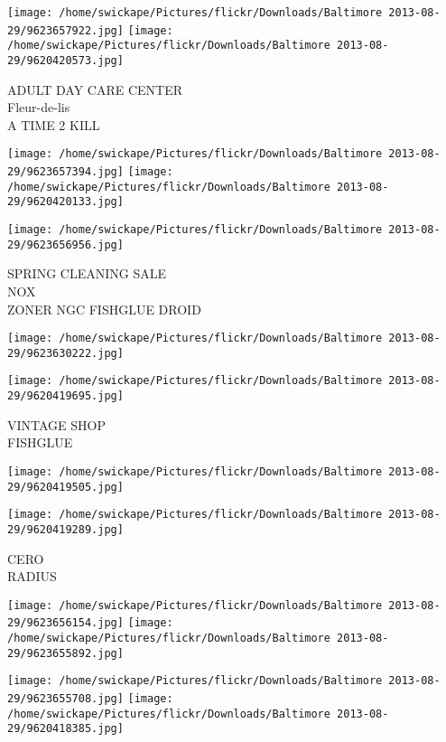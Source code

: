 \documentclass[10pt,letterpaper]{article}
\begin{document}
\vspace{0.25in}
\texttt{[image: /home/swickape/Pictures/flickr/Downloads/Baltimore 2013-08-29/9623657922.jpg]}
\texttt{[image: /home/swickape/Pictures/flickr/Downloads/Baltimore 2013-08-29/9620420573.jpg]}

ADULT DAY CARE CENTER\\
Fleur{-}de{-}lis\\
A TIME 2 KILL
\pagebreak

\texttt{[image: /home/swickape/Pictures/flickr/Downloads/Baltimore 2013-08-29/9623657394.jpg]}
\texttt{[image: /home/swickape/Pictures/flickr/Downloads/Baltimore 2013-08-29/9620420133.jpg]}

\vspace{0.25in}
\texttt{[image: /home/swickape/Pictures/flickr/Downloads/Baltimore 2013-08-29/9623656956.jpg]}

SPRING CLEANING SALE\\
NOX\\
ZONER NGC FISHGLUE DROID
\pagebreak

\texttt{[image: /home/swickape/Pictures/flickr/Downloads/Baltimore 2013-08-29/9623630222.jpg]}

\vspace{0.25in}
\texttt{[image: /home/swickape/Pictures/flickr/Downloads/Baltimore 2013-08-29/9620419695.jpg]}

VINTAGE SHOP\\
FISHGLUE
\pagebreak

\texttt{[image: /home/swickape/Pictures/flickr/Downloads/Baltimore 2013-08-29/9620419505.jpg]}

\vspace{0.25in}
\texttt{[image: /home/swickape/Pictures/flickr/Downloads/Baltimore 2013-08-29/9620419289.jpg]}

CERO\\
RADIUS
\pagebreak

\texttt{[image: /home/swickape/Pictures/flickr/Downloads/Baltimore 2013-08-29/9623656154.jpg]}
\texttt{[image: /home/swickape/Pictures/flickr/Downloads/Baltimore 2013-08-29/9623655892.jpg]}

\texttt{[image: /home/swickape/Pictures/flickr/Downloads/Baltimore 2013-08-29/9623655708.jpg]}
\texttt{[image: /home/swickape/Pictures/flickr/Downloads/Baltimore 2013-08-29/9620418385.jpg]}
\end{document}
